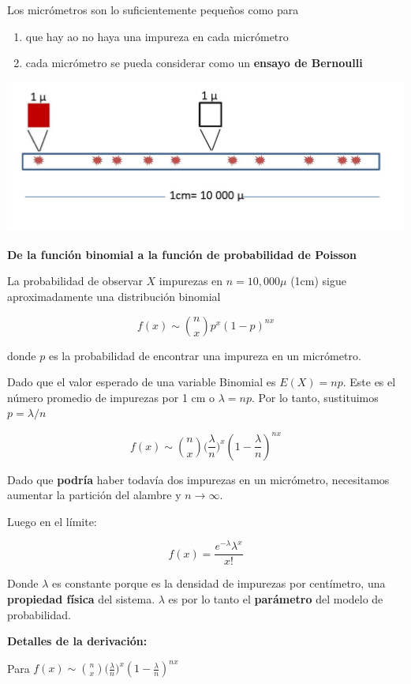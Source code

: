 \documentclass[
]{book}
\begin{document}
Los micrómetros son lo suficientemente pequeños como para

\begin{enumerate}
\def\labelenumi{\arabic{enumi})}
\item
  que hay ao no haya una impureza en cada micrómetro
\item
  cada micrómetro se pueda considerar como un \textbf{ensayo de Bernoulli}
\end{enumerate}

\includegraphics{./figures/Pois.JPG}

\textbf{De la función binomial a la función de probabilidad de Poisson}

La probabilidad de observar \(X\) impurezas en \(n=10,000\mu\) (1cm) sigue aproximadamente una distribución binomial

\[f(x) \sim \binom nxp^x(1-p)^{nx}\]

donde \(p\) es la probabilidad de encontrar una impureza en un micrómetro.

Dado que el valor esperado de una variable Binomial es \(E(X)=np\). Este es el número promedio de impurezas por 1 cm o \(\lambda=np\). Por lo tanto, sustituimos \(p=\lambda/n\)

\[f(x) \sim \binom nx \big(\frac{\lambda}{n}\big)^x(1-\frac{\lambda}{n})^{nx}\]

Dado que \textbf{podría} haber todavía dos impurezas en un micrómetro, necesitamos aumentar la partición del alambre y \(n \rightarrow \infty\).

Luego en el límite:

\[f(x)= \frac{e^{-\lambda}\lambda^x}{x!}\]

Donde \(\lambda\) es constante porque es la densidad de impurezas por centímetro, una \textbf{propiedad física} del sistema. \(\lambda\) es por lo tanto el \textbf{parámetro} del modelo de probabilidad.

\textbf{Detalles de la derivación:}

Para \(f(x) \sim \binom nx \big(\frac{\lambda}{n}\big)^x(1-\frac{\lambda}{n})^{nx}\)
\end{document}
